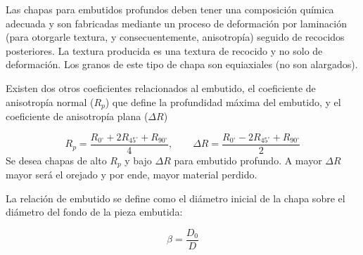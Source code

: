 Las chapas para embutidos profundos deben tener una composición química adecuada y son fabricadas mediante un proceso de deformación por laminación (para otorgarle textura, y consecuentemente, anisotropía) seguido de recocidos posteriores. La textura producida es una textura de recocido y no solo de deformación. Los granos de este tipo de chapa son equiaxiales (no son alargados).

Existen dos otros coeficientes relacionados al embutido, el coeficiente de anisotropía normal ($R_p$) que define la profundidad máxima del embutido, y el coeficiente de anisotropía plana ($\Delta R$)

\begin{equation}
	R_p = \frac{R_{0^\circ} + 2R_{45^\circ} + R_{90^\circ}}{4}, \qquad \Delta R = \frac{R_{0^\circ} - 2R_{45^\circ} + R_{90^\circ}}{2}
\end{equation}
Se desea chapas de alto $R_p$ y bajo $\Delta R$ para embutido profundo. A mayor $\Delta R$ mayor será el orejado y por ende, mayor material perdido.

La relación de embutido se define como el diámetro inicial de la chapa sobre el diámetro del fondo de la pieza embutida:

\begin{equation}
	\beta = \frac{D_0}{D}
\end{equation}



